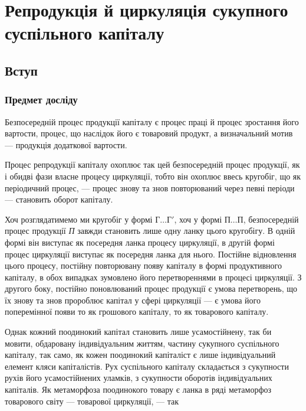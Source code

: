 \chapter{Репродукція й циркуляція сукупного
суспільного капіталу}

\section{Вступ}\footnotemark{}%

\subsection{Предмет досліду}

Безпосередній процес продукції капіталу є процес праці й процес
зростання його вартости, процес, що наслідок його є товаровий продукт,
а визначальний мотив — продукція додаткової вартости.

Процес репродукції капіталу охоплює так цей безпосередній процес
продукції, як і обидві фази власне процесу циркуляції, тобто він охоплює
ввесь кругобіг, що як періодичний процес, — процес знову та знов
повторюваний через певні періоди — становить оборот капіталу.

Хоч розглядатимемо ми кругобіг у формі $Г\dots{} Г'$, хоч у формі $П\dots{} П$,
безпосередній процес продукції \emph{П} завжди становить лише одну ланку
цього кругобігу. В одній формі він виступає як посередня ланка процесу
циркуляції, в другій формі процес циркуляції виступає як посередня
ланка для нього. Постійне відновлення цього процесу, постійну повторювану
появу капіталу в формі продуктивного капіталу, в обох випадках
зумовлено його перетвореннями в процесі циркуляції. З другого боку,
постійно поновлюваний процес продукції є умова перетворень, що їх
знову та знов пророблює капітал у сфері циркуляції — є умова його
поперемінної появи то як грошового капіталу, то як товарового
капіталу.

Однак кожний поодинокий капітал становить лише усамостійнену, так
би мовити, обдаровану індивідуальним життям, частину сукупного суспільного
капіталу, так само, як кожен поодинокий капіталіст є лише індивідуальний
елемент кляси капіталістів. Рух суспільного капіталу складається
з сукупности рухів його усамостійнених уламків, з сукупности оборотів
індивідуальних капіталів. Як метаморфоза поодинокого товару є ланка
в ряді метаморфоз товарового світу — товарової циркуляції, — так
\parbreak{}  %
